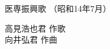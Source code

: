 \documentclass[10pt,b5j]{tarticle} %
\begin{document}
\begin{minipage}[c]{0.7\hsize} %
    \begin{center}
        {\LARGE
            医専振興歌 %
        }
        {\small 
            （昭和14年7月） %
        }
    \end{center}
\end{minipage}
\begin{minipage}[c]{0.3\hsize} %
    \begin{flushright} %
        高見浩也君 作歌\\向井弘君 作曲 %
    \end{flushright}
\end{minipage}
\end{document}
